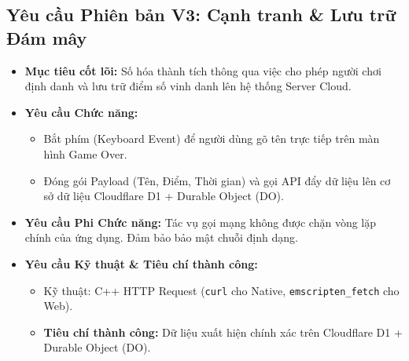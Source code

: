 \documentclass[12pt,a4paper]{article}
\begin{document}

\subsection{Yêu cầu Phiên bản V3: Cạnh tranh \& Lưu trữ Đám mây}
\begin{itemize}[leftmargin=*]
    \item \textbf{Mục tiêu cốt lõi:} Số hóa thành tích thông qua việc cho phép người chơi định danh và lưu trữ điểm số vinh danh lên hệ thống Server Cloud.
    \item \textbf{Yêu cầu Chức năng:}
    \begin{itemize}[noitemsep]
        \item Bắt phím (Keyboard Event) để người dùng gõ tên trực tiếp trên màn hình Game Over.
        \item Đóng gói Payload (Tên, Điểm, Thời gian) và gọi API đẩy dữ liệu lên cơ sở dữ liệu Cloudflare D1 + Durable Object (DO).
    \end{itemize}
    \item \textbf{Yêu cầu Phi Chức năng:} Tác vụ gọi mạng không được chặn vòng lặp chính của ứng dụng. Đảm bảo bảo mật chuỗi định dạng.
    \item \textbf{Yêu cầu Kỹ thuật \& Tiêu chí thành công:}
    \begin{itemize}[noitemsep]
        \item Kỹ thuật: C++ HTTP Request (\texttt{curl} cho Native, \texttt{emscripten\_fetch} cho Web).
        \item \textbf{Tiêu chí thành công:} Dữ liệu xuất hiện chính xác trên Cloudflare D1 + Durable Object (DO).
    \end{itemize}
\end{itemize}

\label{LastPageGameCoreRequirements}
\end{document}
